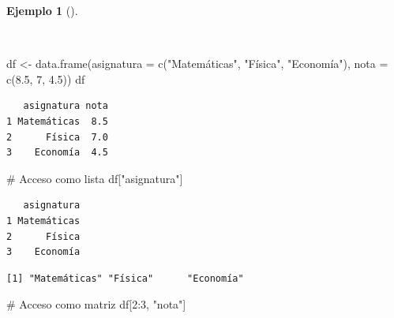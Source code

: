 \documentclass[
  a4paper,
]{scrreport}
\newenvironment{Shaded}{\begin{snugshade}}{\end{snugshade}}
\newcommand{\AttributeTok}[1]{\textcolor[rgb]{0.40,0.45,0.13}{#1}}
\newcommand{\CommentTok}[1]{\textcolor[rgb]{0.37,0.37,0.37}{#1}}
\newcommand{\DecValTok}[1]{\textcolor[rgb]{0.68,0.00,0.00}{#1}}
\newcommand{\FloatTok}[1]{\textcolor[rgb]{0.68,0.00,0.00}{#1}}
\newcommand{\FunctionTok}[1]{\textcolor[rgb]{0.28,0.35,0.67}{#1}}
\newcommand{\NormalTok}[1]{\textcolor[rgb]{0.00,0.23,0.31}{#1}}
\newcommand{\OtherTok}[1]{\textcolor[rgb]{0.00,0.23,0.31}{#1}}
\newcommand{\SpecialCharTok}[1]{\textcolor[rgb]{0.37,0.37,0.37}{#1}}
\newcommand{\StringTok}[1]{\textcolor[rgb]{0.13,0.47,0.30}{#1}}
\theoremstyle{definition}
\theoremstyle{definition}
\newtheorem{example}{Ejemplo}[chapter]
\theoremstyle{remark}
\begin{document}
\begin{example}[]\protect\hypertarget{exm-acceso-data-frame}{}\label{exm-acceso-data-frame}

~

\begin{Shaded}
\begin{Highlighting}[]
\NormalTok{df }\OtherTok{\textless{}{-}} \FunctionTok{data.frame}\NormalTok{(}\AttributeTok{asignatura =} \FunctionTok{c}\NormalTok{(}\StringTok{"Matemáticas"}\NormalTok{, }\StringTok{"Física"}\NormalTok{, }\StringTok{"Economía"}\NormalTok{), }\AttributeTok{nota =} \FunctionTok{c}\NormalTok{(}\FloatTok{8.5}\NormalTok{, }\DecValTok{7}\NormalTok{, }\FloatTok{4.5}\NormalTok{))}
\NormalTok{df}
\end{Highlighting}
\end{Shaded}

\begin{verbatim}
   asignatura nota
1 Matemáticas  8.5
2      Física  7.0
3    Economía  4.5
\end{verbatim}

\begin{Shaded}
\begin{Highlighting}[]
\CommentTok{\# Acceso como lista}
\NormalTok{df[}\StringTok{"asignatura"}\NormalTok{]}
\end{Highlighting}
\end{Shaded}

\begin{verbatim}
   asignatura
1 Matemáticas
2      Física
3    Economía
\end{verbatim}

\begin{Shaded}
\end{Shaded}

\begin{verbatim}
[1] "Matemáticas" "Física"      "Economía"   
\end{verbatim}

\begin{Shaded}
\begin{Highlighting}[]
\CommentTok{\# Acceso como matriz}
\NormalTok{df[}\DecValTok{2}\SpecialCharTok{:}\DecValTok{3}\NormalTok{, }\StringTok{"nota"}\NormalTok{]}
\end{Highlighting}
\end{Shaded}


\end{example}
\end{document}
